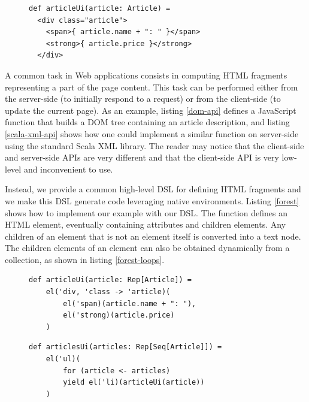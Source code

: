 \documentclass[preprint]{sigplanconf}
\begin{document}
\begin{figure}
\begin{lstlisting}[caption=Scala XML API,label=scala-xml-api]
def articleUi(article: Article) =
  <div class="article">
    <span>{ article.name + ": " }</span>
    <strong>{ article.price }</strong>
  </div>
\end{lstlisting}
\end{figure}

A common task in Web applications consists in computing HTML fragments representing a part of the
page content. This task can be performed either from the server-side (to initially respond to a
request) or from the client-side (to update the current page). As an example, listing \ref{dom-api}
defines a JavaScript function  that builds a DOM tree containing an article
description, and listing \ref{scala-xml-api} shows how one could implement a similar function on
server-side using the standard Scala XML library. The reader may notice that the client-side
and server-side APIs are very different and that the client-side API is very low-level and
inconvenient to use.

Instead, we provide a common high-level DSL for defining HTML fragments and we make this DSL
generate code leveraging native environments. Listing \ref{forest} shows how to implement our
example with our DSL. The  function defines an HTML element, eventually containing
attributes and children elements. Any children of an element that is not an element itself is
converted into a text node. The children elements of an element can also be obtained
dynamically from a collection, as shown in listing \ref{forest-loops}.

\begin{figure}
\begin{lstlisting}[label=forest,caption=DOM definition DSL]
def articleUi(article: Rep[Article]) =
    el('div, 'class -> 'article)(
        el('span)(article.name + ": "),
        el('strong)(article.price)
    )
\end{lstlisting}
\end{figure}

\begin{figure}
\begin{lstlisting}[label=forest-loops,caption=Using loops]
def articlesUi(articles: Rep[Seq[Article]]) =
    el('ul)(
        for (article <- articles)
        yield el('li)(articleUi(article))
    )
\end{lstlisting}
\end{figure}
\end{document}
